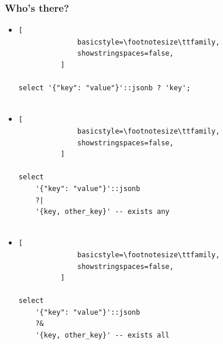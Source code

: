 \documentclass[14pt, compress]{beamer}
\begin{document}
\begin{frame}[fragile]
  \frametitle{Who's there?}
  \vspace{-20pt}

  \begin{itemize}
      \item
          \begin{lstlisting}[
              basicstyle=\footnotesize\ttfamily,
              showstringspaces=false,
          ]

select '{"key": "value"}'::jsonb ? 'key';
         
          \end{lstlisting}

      \item
          \begin{lstlisting}[
              basicstyle=\footnotesize\ttfamily,
              showstringspaces=false,
          ]

select 
    '{"key": "value"}'::jsonb
    ?|
    '{key, other_key}' -- exists any
         
          \end{lstlisting}

      \item
          \begin{lstlisting}[
              basicstyle=\footnotesize\ttfamily,
              showstringspaces=false,
          ]

select 
    '{"key": "value"}'::jsonb
    ?&
    '{key, other_key}' -- exists all
         
          \end{lstlisting}

  \end{itemize}

\end{frame}
\end{document}
